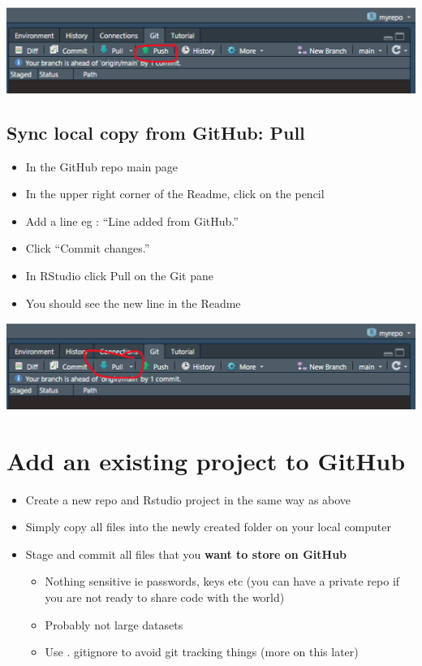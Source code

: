 \documentclass[
  letterpaper,
  DIV=11,
  numbers=noendperiod]{scrreprt}
\providecommand{\tightlist}{%
  \setlength{\itemsep}{0pt}\setlength{\parskip}{0pt}}\usepackage{longtable,booktabs,array}
\begin{document}
\includegraphics{assets/img/push.png}

\hypertarget{sync-local-copy-from-github-pull}{%
\subsection{Sync local copy from GitHub:
Pull}\label{sync-local-copy-from-github-pull}}

\begin{itemize}
\tightlist
\item
  In the GitHub repo main page\\
\item
  In the upper right corner of the Readme, click on the pencil
\item
  Add a line eg : ``Line added from GitHub.''
\item
  Click ``Commit changes.''
\item
  In RStudio click Pull on the Git pane
\item
  You should see the new line in the Readme
\end{itemize}

\includegraphics{assets/img/pull.png}

\hypertarget{add-an-existing-project-to-github}{%
\section{Add an existing project to
GitHub}\label{add-an-existing-project-to-github}}

\begin{itemize}
\tightlist
\item
  Create a new repo and Rstudio project in the same way as above
\item
  Simply copy all files into the newly created folder on your local
  computer
\item
  Stage and commit all files that you \textbf{want to store on GitHub}

  \begin{itemize}
  \tightlist
  \item
    Nothing sensitive ie passwords, keys etc (you can have a private
    repo if you are not ready to share code with the world)
  \item
    Probably not large datasets
  \item
    Use . gitignore to avoid git tracking things (more on this later)
  \end{itemize}
\end{itemize}
\end{document}
